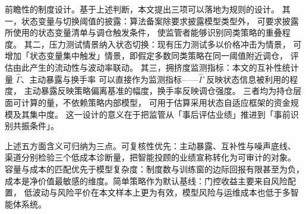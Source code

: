 前瞻性的制度设计。基于上述判断，本文提出三项可以落地为规则的设计。
其一，状态变量与切换阈值的披露：算法备案除要求披露模型类型外，
可要求披露所使用的状态变量清单与调仓触发条件，
使监管者能够识别同类策略的重叠程度。
其二，压力测试情景纳入状态切换：现有压力测试多以价格冲击为情景，
可增加「状态变量集中触发」情景，即假定多数同类策略在同一阈值附近调仓，
评估由此产生的流动性与波动率联动。
其三，拥挤度监测指标：本文的互补性统计量 $\hat\Gamma$、主动暴露与换手率
可以直接作为监测指标——$\hat\Gamma$ 反映状态信息被利用的程度，
主动暴露反映策略偏离基准的幅度，换手率反映调仓强度。
三者均为持仓层面可计算的量，不依赖策略内部模型，
可用于估算采用状态自适应框架的资金规模及其集中度。
这一设计的意义在于把监管从「事后评估业绩」推进到「事前识别共振条件」。

上述五方面含义可归纳为三点。可复核性优先：主动暴露、互补性与噪声底线、
渠道分别检验三个低成本诊断量，把智能投顾的业绩宣称转化为可审计的对象。
容量与成本的匹配优先于模型复杂度：制度数与训练窗的边际回报有限甚至为负，
成本是净价值最敏感的维度。简单策略作为默认基线：门控收益主要来自风险配置，
低波动与风险平价在本文样本上更为有效，模型风险与运维成本也低于多智能体系统。
